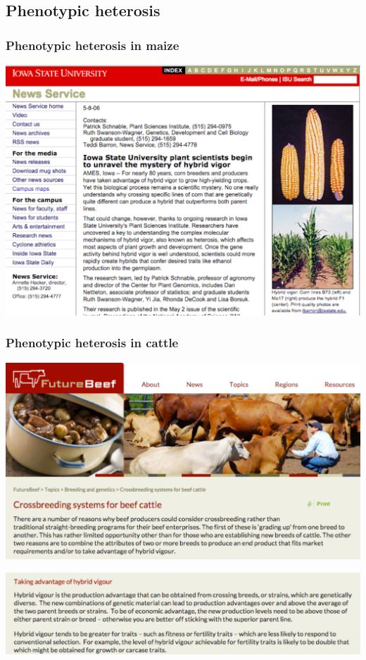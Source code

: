 \documentclass[handout]{beamer}\usepackage[]{graphicx}\usepackage[]{color}
\begin{document}
\subsection{Phenotypic heterosis}

\begin{frame}
\frametitle{Phenotypic heterosis in maize}
\begin{center}
\includegraphics{heterosis_corn}
\end{center}
\end{frame}


\begin{frame}
\frametitle{Phenotypic heterosis in cattle}

\vspace{-0.1in}

\begin{center}
\includegraphics{heterosis_cattle1}

\includegraphics{heterosis_cattle2}
\end{center}
\end{frame}
\end{document}
